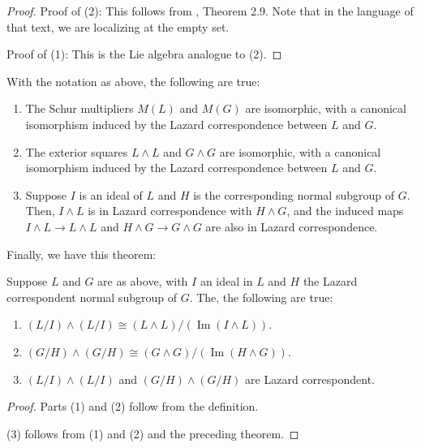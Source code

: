 \begin{proof}
  Proof of (2): This follows from \cite{HiltonMislinRoitberg}, Theorem
  2.9. Note that in the language of that text, we are localizing at
  the empty set.

  Proof of (1): This is the Lie algebra analogue to (2).

  
\end{proof}
\begin{theorem}
  With the notation as above, the following are true:

  \begin{enumerate}
  \item The Schur multipliers $M(L)$ and $M(G)$ are isomorphic, with a
    canonical isomorphism induced by the Lazard correspondence between
    $L$ and $G$.
  \item The exterior squares $L \wedge L$ and $G \wedge G$ are
    isomorphic, with a canonical isomorphism induced by the Lazard
    correspondence between $L$ and $G$.
  \item Suppose $I$ is an ideal of $L$ and $H$ is the corresponding
    normal subgroup of $G$. Then, $I \wedge L$ is in Lazard
    correspondence with $H \wedge G$, and the induced maps $I \wedge L
    \to L \wedge L$ and $H \wedge G \to G \wedge G$ are also in Lazard
    correspondence.
  \end{enumerate}
\end{theorem}

Finally, we have this theorem:

\begin{theorem}
  Suppose $L$ and $G$ are as above, with $I$ an ideal in $L$ and $H$
  the Lazard correspondent normal subgroup of $G$. The, the following
  are true:

  \begin{enumerate}
  \item $(L/I) \wedge (L/I) \cong (L \wedge L)/(\operatorname{Im}(I \wedge L))$. 
  \item $(G/H) \wedge (G/H) \cong (G \wedge G)/(\operatorname{Im}(H \wedge G))$.
  \item $(L/I) \wedge (L/I)$ and $(G/H) \wedge (G/H)$ are Lazard
    correspondent.
  \end{enumerate}
\end{theorem}

\begin{proof}
  Parts (1) and (2) follow from the definition.

  (3) follows from (1) and (2) and the preceding theorem.
\end{proof}

